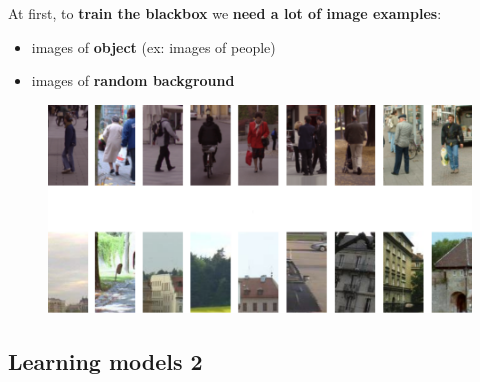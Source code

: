 \documentclass{beamer}[10pt, usepdftitle=false, handout]
\begin{document}
    \begin{frame}
	
	At first, to \textbf{train the blackbox} we \textbf{need a lot of image examples}:
	\vspace*{1em}	
	
	\begin{itemize}
	\item{images of \textbf{object} (ex: images of people)}
	\item{images of \textbf{random background}}	
	\end{itemize}	 
	\vspace*{0.5em}	
	
	\begin{figure}
		\includegraphics[scale=0.5]{18.png} 
	\end{figure}
	
	\end{frame}    
    
   \subsection{Learning models 2}    
    
\end{document}
